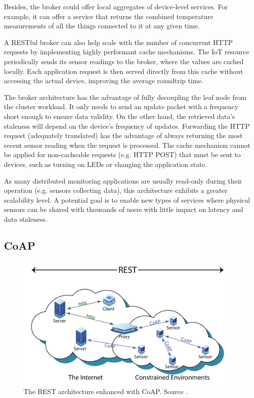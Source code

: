 Besides, the broker could offer local aggregates of device-level services. For example, it can offer a service that returns the combined temperature measurements of all the things connected to it at any given time.

A RESTful broker can also help scale with the number of concurrent HTTP requests by implementing highly performant cache mechanisms. The IoT resource periodically sends its sensor readings to the broker, where the values are cached locally. Each application request is then served directly from this cache without accessing the actual device, improving the average roundtrip time.

The broker architecture has the advantage of fully decoupling the leaf node from the cluster workload. It only needs to send an update packet with a frequency short enough to ensure data validity. On the other hand, the retrieved data's staleness will depend on the device's frequency of updates. Forwarding the HTTP request (adequately translated) has the advantage of always returning the most recent sensor reading when the request is processed. The cache mechanism cannot be applied for non-cacheable requests (e.g. HTTP POST) that must be sent to devices, such as turning on LEDs or changing the application state.

As many distributed monitoring applications are usually read-only during their operation (e.g. sensors collecting data), this architecture exhibits a greater scalability level. A potential goal is to enable new types of services where physical sensors can be shared with thousands of users with little impact on latency and data staleness.

\subsection{CoAP}
\label{sec:coap}

\begin{figure}[ht]
\centering
\includegraphics[width=\columnwidth]{figures/coap}
\caption{The REST architecture enhanced with CoAP. Source \cite{bormann2012coap}.}
\label{fig:coap}
\end{figure}

